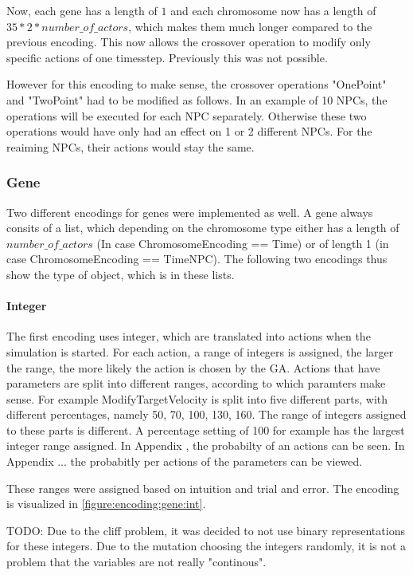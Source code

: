 Now, each gene has a length of $1$ and each chromosome now has a length of $35 * 2 * number\_of\_actors$, which makes them much longer compared to the previous encoding. This now allows the crossover operation to modify only specific actions of one timesstep. Previously this was not possible.

However for this encoding to make sense, the crossover operations "OnePoint" and "TwoPoint" had to be modified as follows. In an example of 10 NPCs, the operations will be executed for each NPC separately. Otherwise these two operations would have only had an effect on 1 or 2 different NPCs. For the reaiming NPCs, their actions would stay the same.

\subsubsection{Gene}
Two different encodings for genes were implemented as well. A gene always consits of a list, which depending on the chromosome type either has a length of $number\_of\_actors$ (In case ChromosomeEncoding == Time) or of length 1 (in case ChromosomeEncoding == TimeNPC). The following two encodings thus show the type of object, which is in these lists.

\paragraph{Integer}
The first encoding uses integer, which are translated into actions when the simulation is started. For each action, a range of integers is assigned, the larger the range, the more likely the action is chosen by the GA. Actions that have parameters are split into different ranges, according to which paramters make sense. For example ModifyTargetVelocity is split into five different parts, with different percentages, namely 50, 70, 100, 130, 160. The range of integers assigned to these parts is different. A percentage setting of 100 for example has the largest integer range assigned.
In Appendix , the probabilty of an actions can be seen. In Appendix ... the probabitly per actions of the parameters can be viewed.

These ranges were assigned based on intuition and trial and error. The encoding is visualized in \ref{figure:encoding:gene:int}.

TODO: Due to the cliff problem, it was decided to not use binary representations for these integers. Due to the mutation choosing the integers randomly, it is not a problem that the variables are not really "continous".

